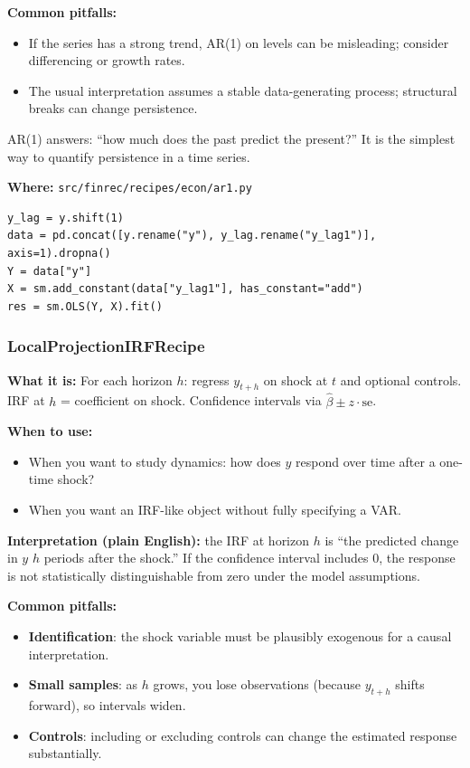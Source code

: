 \documentclass[11pt,a4paper]{article}
\begin{document}
\textbf{Common pitfalls:}
\begin{itemize}[leftmargin=2em]
  \item If the series has a strong trend, AR(1) on levels can be misleading; consider differencing or growth rates.
  \item The usual interpretation assumes a stable data-generating process; structural breaks can change persistence.
\end{itemize}

\begin{intuitionbox}
AR(1) answers: ``how much does the past predict the present?'' It is the simplest way to quantify persistence in a time series.
\end{intuitionbox}

\textbf{Where:} \texttt{src/finrec/recipes/econ/ar1.py}

\begin{lstlisting}
y_lag = y.shift(1)
data = pd.concat([y.rename("y"), y_lag.rename("y_lag1")], axis=1).dropna()
Y = data["y"]
X = sm.add_constant(data["y_lag1"], has_constant="add")
res = sm.OLS(Y, X).fit()
\end{lstlisting}

\subsubsection{LocalProjectionIRFRecipe}\label{sec:lp-irf}

\textbf{What it is:} For each horizon $h$: regress $y_{t+h}$ on shock at $t$ and optional controls. IRF at $h$ = coefficient on shock. Confidence intervals via $\hat{\beta} \pm z \cdot \text{se}$.

\textbf{When to use:}
\begin{itemize}[leftmargin=2em]
  \item When you want to study dynamics: how does \(y\) respond over time after a one-time shock?
  \item When you want an IRF-like object without fully specifying a VAR.
\end{itemize}

\textbf{Interpretation (plain English):} the IRF at horizon \(h\) is ``the predicted change in \(y\) \(h\) periods after the shock.'' If the confidence interval includes 0, the response is not statistically distinguishable from zero under the model assumptions.

\textbf{Common pitfalls:}
\begin{itemize}[leftmargin=2em]
  \item \textbf{Identification}: the shock variable must be plausibly exogenous for a causal interpretation.
  \item \textbf{Small samples}: as \(h\) grows, you lose observations (because \(y_{t+h}\) shifts forward), so intervals widen.
  \item \textbf{Controls}: including or excluding controls can change the estimated response substantially.
\end{itemize}
\end{document}
